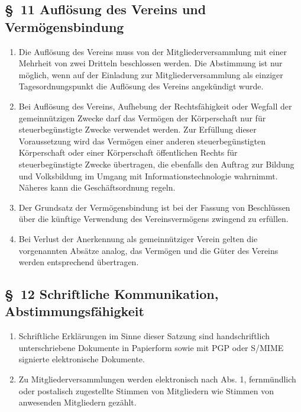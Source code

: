 \documentclass[10pt,a4paper]{scrartcl}
\begin{document}
\subsection*{\S \ 11 Aufl{\"o}sung des Vereins und Verm{\"o}gensbindung}
\begin{enumerate}
	\item Die Aufl{\"o}sung des Vereins muss von der Mitgliederversammlung mit einer Mehrheit von
		zwei Dritteln beschlossen werden. Die Abstimmung ist nur m{\"o}glich, wenn auf der Einladung
		zur Mitgliederversammlung als einziger Tagesordnungspunkt die Aufl{\"o}sung des Vereins
		angek{\"u}ndigt wurde.
	\item Bei Aufl{\"o}sung des Vereins, Aufhebung der Rechtsf{\"a}higkeit oder Wegfall der
		gemeinn{\"u}tzigen Zwecke darf das Verm{\"o}gen der K{\"o}rperschaft nur f{\"u}r
		steuerbeg{\"u}nstigte Zwecke verwendet werden. Zur Erf{\"u}llung dieser
		Voraussetzung wird das Verm{\"o}gen einer anderen steu\-er\-be\-g{\"u}ns\-tig\-ten
		K{\"o}rperschaft oder einer K{\"o}rperschaft {\"o}ffentlichen Rechts f{\"u}r
		steuerbeg{\"u}nstigte Zwecke {\"u}ber\-tra\-gen, die ebenfalls den Auftrag
		zur Bildung und Volksbildung im Umgang mit Informationstechnologie
		wahrnimmt. N{\"a}\-he\-res kann die Gesch{\"a}ftsordnung regeln.
	\item Der Grundsatz der Verm{\"o}gensbindung ist bei der Fassung von
		Beschl{\"u}ssen {\"u}ber die k{\"u}nf\-ti\-ge Verwendung des Vereinsverm{\"o}gens zwingend
		zu erf{\"u}llen.
	\item Bei Verlust der Anerkennung als gemeinn{\"u}tziger Verein gelten die vorgenannten Abs{\"a}tze analog, 
		das Verm{\"o}gen und die G{\"u}ter des Vereins werden entsprechend {\"u}bertragen.
\end{enumerate}
%
%
\subsection*{\S \ 12 Schriftliche Kommunikation, Abstimmungsf{\"a}higkeit}
\begin{enumerate}
	\item Schriftliche Erkl{\"a}rungen im Sinne dieser Satzung sind
		handschriftlich unterschriebene Dokumente in Papierform sowie
		mit PGP oder S/MIME signierte elektronische Dokumente.
	\item Zu Mitgliederversammlungen werden elektronisch nach Abs. 1,
		fernm{\"u}ndlich oder postalisch zugestellte Stimmen von Mitgliedern
		wie Stimmen von anwesenden Mitgliedern gez{\"a}hlt.
\end{enumerate}
\end{document}
